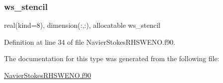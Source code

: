 \subsubsection{\texorpdfstring{ws\+\_\+stencil}{ws\_stencil}}
{\footnotesize\ttfamily real(kind=8), dimension(\+:,\+:), allocatable ws\+\_\+stencil}



Definition at line 34 of file Navier\+Stokes\+R\+H\+S\+W\+E\+N\+O.\+f90.



The documentation for this type was generated from the following file\+:\begin{DoxyCompactItemize}
\item 
\hyperlink{NavierStokesRHSWENO_8f90}{Navier\+Stokes\+R\+H\+S\+W\+E\+N\+O.\+f90}\end{DoxyCompactItemize}

